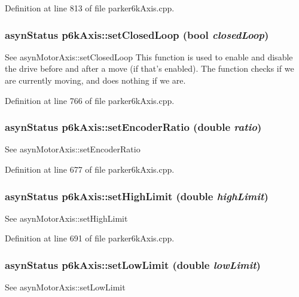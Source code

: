 Definition at line 813 of file parker6kAxis.cpp.\hypertarget{classp6kAxis_a5cbedc48fd583be88d11b734a5975731}{
\subsubsection[{setClosedLoop}]{\setlength{\rightskip}{0pt plus 5cm}asynStatus p6kAxis::setClosedLoop (bool {\em closedLoop})}}
\label{classp6kAxis_a5cbedc48fd583be88d11b734a5975731}
See asynMotorAxis::setClosedLoop This function is used to enable and disable the drive before and after a move (if that's enabled). The function checks if we are currently moving, and does nothing if we are. 

Definition at line 766 of file parker6kAxis.cpp.\hypertarget{classp6kAxis_a23f81b882829e5c4b8a16914f407d0b1}{
\subsubsection[{setEncoderRatio}]{\setlength{\rightskip}{0pt plus 5cm}asynStatus p6kAxis::setEncoderRatio (double {\em ratio})}}
\label{classp6kAxis_a23f81b882829e5c4b8a16914f407d0b1}
See asynMotorAxis::setEncoderRatio 

Definition at line 677 of file parker6kAxis.cpp.\hypertarget{classp6kAxis_adbf1eae63acf42149a8c1971c7f39741}{
\subsubsection[{setHighLimit}]{\setlength{\rightskip}{0pt plus 5cm}asynStatus p6kAxis::setHighLimit (double {\em highLimit})}}
\label{classp6kAxis_adbf1eae63acf42149a8c1971c7f39741}
See asynMotorAxis::setHighLimit 

Definition at line 691 of file parker6kAxis.cpp.\hypertarget{classp6kAxis_a9773f833d8098bb6a99eb07f4a06bd8f}{
\subsubsection[{setLowLimit}]{\setlength{\rightskip}{0pt plus 5cm}asynStatus p6kAxis::setLowLimit (double {\em lowLimit})}}
\label{classp6kAxis_a9773f833d8098bb6a99eb07f4a06bd8f}
See asynMotorAxis::setLowLimit 

